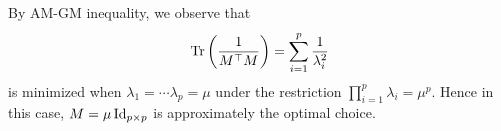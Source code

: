 \begin{example}
%
By AM-GM inequality, we observe that
$$\operatorname{Tr}\left( \frac{1}{M^\top M}\right) = \sum_{i=1}^p\frac{1}{\lambda_i^2}$$
is minimized when $\lambda_1 = \cdots\lambda_p=\mu$ under the restriction $\prod_{i=1}^p\lambda_i =\mu^p$. Hence in this case, $M=\mu \operatorname{Id}_{p\times p}$ is approximately the optimal choice.

%

\end{example}
